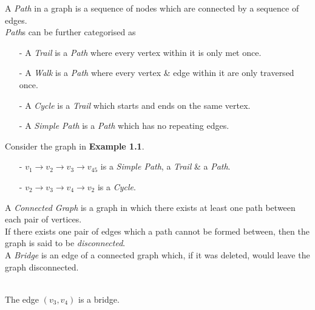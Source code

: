\documentclass[11pt,a4paper]{article}
\begin{document}
A \textit{Path} in a graph is a sequence of nodes which are connected by a sequence of edges.\\
\textit{Path}s can be further categorised as
\begin{itemize}
	\item[-] A \textit{Trail} is a \textit{Path} where every vertex within it is only met once.
	\item[-] A \textit{Walk} is a \textit{Path} where every vertex \& edge within it are only traversed once.
	\item[-] A \textit{Cycle} is a \textit{Trail} which starts and ends on the same vertex.
	\item[-] A \textit{Simple Path} is a \textit{Path} which has no repeating edges.
\end{itemize}

Consider the graph in \textbf{Example 1.1}.
\begin{itemize}
	\item[-] $v_1\to v_2\to v_3\to v_45$ is a \textit{Simple Path}, a \textit{Trail} \& a \textit{Path}.
	\item[-] $v_2\to v_3\to v_4\to v_2$ is a \textit{Cycle}.\\
\end{itemize}

A \textit{Connected Graph} is a graph in which there exists at least one path between each pair of vertices.\\
If there exists one pair of edges which a path cannot be formed between, then the graph is said to be \textit{disconnected}.\\

A \textit{Bridge} is an edge of a connected graph which, if it was deleted, would leave the graph disconnected.\\

\newpage
{}
\\
\nb The edge $(v_3,v_4)$ is a bridge.\\
\end{document}
